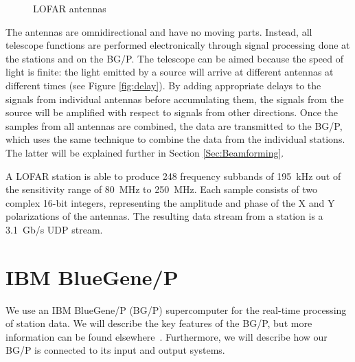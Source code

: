 \documentclass{llncs}
\begin{document}
\begin{figure}[ht]
\hfill
{}
\caption{LOFAR antennas}
\end{figure}

The antennas are omnidirectional and have no moving parts. Instead, all telescope functions are performed electronically through signal processing done at the stations and on the BG/P. The telescope can be aimed because the speed of light is finite: the light emitted by a source will arrive at different antennas at different times (see Figure \ref{fig:delay}). By adding appropriate delays to the signals from individual antennas before accumulating them, the signals from the source will be amplified with respect to signals from other directions. Once the samples from all antennas are combined, the data are transmitted to the BG/P, which uses the same technique to combine the data from the individual stations. The latter will be explained further in Section \ref{Sec:Beamforming}.

A LOFAR station is able to produce 248 frequency subbands of 195~kHz out of the sensitivity range of 80~MHz to 250~MHz. Each sample consists of two complex 16-bit integers, representing the amplitude and phase of the X and Y polarizations of the antennas. The resulting data stream from a station is a 3.1~Gb/s UDP stream.


\section{IBM BlueGene/P}

We use an IBM BlueGene/P (BG/P) supercomputer for the real-time processing of station data. We will describe the key features of the BG/P, but more information can be found elsewhere~\cite{IBM:08}. Furthermore, we will describe how our BG/P is connected to its input and output systems.
\end{document}
